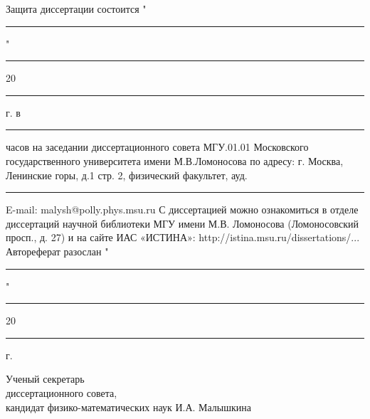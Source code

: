 \vfill


Защита диссертации состоится  "\rule{3mm}{0.15mm}" \rule{15mm}{0.15mm} 20\rule{3mm}{0.15mm} г. в \rule{5mm}{0.15mm} часов на заседании диссертационного совета МГУ.01.01 Московского государственного университета имени М.В.Ломоносова по адресу: г. Москва, Ленинские горы, д.1 стр. 2, физический факультет, ауд.\rule{5mm}{0.15mm}
\bigbreak
E-mail: malysh@polly.phys.msu.ru
\bigbreak
С диссертацией можно ознакомиться в отделе диссертаций научной библиотеки МГУ имени М.В. Ломоносова (Ломоносовский просп., д. 27) и на сайте ИАС «ИСТИНА»: http://istina.msu.ru/dissertations/...
Автореферат разослан "\rule{3mm}{0.15mm}" \rule{15mm}{0.15mm} 20\rule{3mm}{0.15mm} г.

\bigbreak

{\parindent0pt Ученый секретарь \\
диссертационного совета, \\
кандидат физико-математических наук \hfill	И.А. Малышкина}

\newpage
